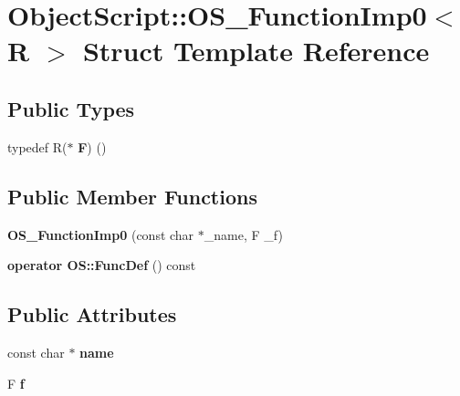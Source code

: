 \hypertarget{struct_object_script_1_1_o_s___function_imp0}{}\section{Object\+Script\+:\+:O\+S\+\_\+\+Function\+Imp0$<$ R $>$ Struct Template Reference}
\label{struct_object_script_1_1_o_s___function_imp0}
\subsection*{Public Types}
\begin{DoxyCompactItemize}
\item 
typedef R($\ast$ {\bfseries F}) ()\hypertarget{struct_object_script_1_1_o_s___function_imp0_a4ab06d0e6de314575dbeab9a48506694}{}\label{struct_object_script_1_1_o_s___function_imp0_a4ab06d0e6de314575dbeab9a48506694}

\end{DoxyCompactItemize}
\subsection*{Public Member Functions}
\begin{DoxyCompactItemize}
\item 
{\bfseries O\+S\+\_\+\+Function\+Imp0} (const char $\ast$\+\_\+name, F \+\_\+f)\hypertarget{struct_object_script_1_1_o_s___function_imp0_a115828f488ed765a3392d9b50071e21a}{}\label{struct_object_script_1_1_o_s___function_imp0_a115828f488ed765a3392d9b50071e21a}

\item 
{\bfseries operator O\+S\+::\+Func\+Def} () const \hypertarget{struct_object_script_1_1_o_s___function_imp0_aa8ebced1dbadaf726a4537df53c3b652}{}\label{struct_object_script_1_1_o_s___function_imp0_aa8ebced1dbadaf726a4537df53c3b652}

\end{DoxyCompactItemize}
\subsection*{Public Attributes}
\begin{DoxyCompactItemize}
\item 
const char $\ast$ {\bfseries name}\hypertarget{struct_object_script_1_1_o_s___function_imp0_a67f9abe09cddd8676e09aff838f08b37}{}\label{struct_object_script_1_1_o_s___function_imp0_a67f9abe09cddd8676e09aff838f08b37}

\item 
F {\bfseries f}\hypertarget{struct_object_script_1_1_o_s___function_imp0_a5a28413006e2985747464c8e67cbe76d}{}\label{struct_object_script_1_1_o_s___function_imp0_a5a28413006e2985747464c8e67cbe76d}

\end{DoxyCompactItemize}


